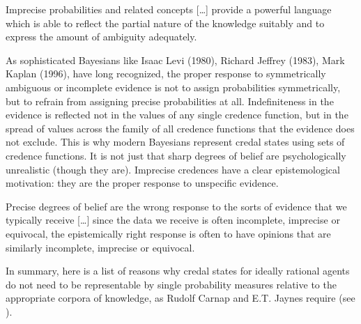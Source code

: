 \begin{quotex}
  Imprecise probabilities and related concepts [{\ldots}] provide a powerful language which is able to reflect the partial nature of the knowledge suitably and to express the amount of ambiguity adequately. 
\end{quotex}

\begin{quotex}
  As sophisticated Bayesians like Isaac Levi (1980), Richard Jeffrey (1983), Mark Kaplan (1996), have long recognized, the proper response to symmetrically ambiguous or incomplete evidence is not to assign probabilities symmetrically, but to refrain from assigning precise probabilities at all. Indefiniteness in the evidence is reflected not in the values of any single credence function, but in the spread of values across the family of all credence functions that the evidence does not exclude. This is why modern Bayesians represent credal states using sets of credence functions. It is not just that sharp degrees of belief are psychologically unrealistic (though they are). Imprecise credences have a clear epistemological motivation: they are the proper response to unspecific evidence. 
\end{quotex}

\begin{quotex}
  Precise degrees of belief are the wrong response to the sorts of evidence that we typically receive [{\ldots}] since the data we receive is often incomplete, imprecise or equivocal, the epistemically right response is often to have opinions that are similarly incomplete, imprecise or equivocal. 
\end{quotex}

In summary, here is a list of reasons why credal states for ideally rational agents do not need to be representable by single probability measures relative to the appropriate corpora of knowledge, as Rudolf Carnap and E.T. Jaynes require (see ).

